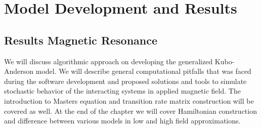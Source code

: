 \chapter{Model Development and Results}
\section{Results Magnetic Resonance}
We will discuss algorithmic approach on developing the generalized Kubo-Anderson model. We will describe general computational pitfalls that was faced during the software development and proposed solutions and tools to simulate stochastic behavior of the interacting systems in applied magnetic field. The introduction to Masters equation and transition rate matrix construction will be covered as well. At the end of the chapter we will cover Hamiltonian construction and difference between various models in low and high field approximations.
